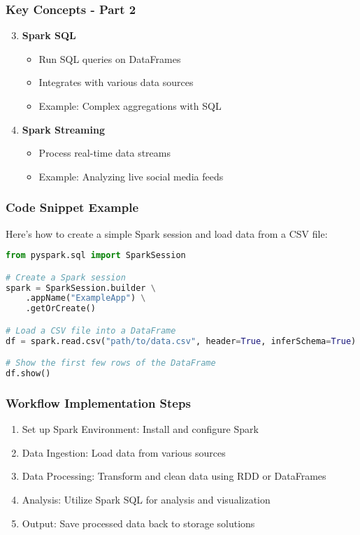 \documentclass[aspectratio=169]{beamer}
\begin{document}
\begin{frame}[fragile]
    \frametitle{Key Concepts - Part 2}
    \begin{enumerate}
        \setcounter{enumi}{2}
        \item \textbf{Spark SQL}
            \begin{itemize}
                \item Run SQL queries on DataFrames
                \item Integrates with various data sources
                \item Example: Complex aggregations with SQL
            \end{itemize}
        \item \textbf{Spark Streaming}
            \begin{itemize}
                \item Process real-time data streams
                \item Example: Analyzing live social media feeds
            \end{itemize}
    \end{enumerate}
\end{frame}

\begin{frame}[fragile]
    \frametitle{Code Snippet Example}
    Here's how to create a simple Spark session and load data from a CSV file:
    \begin{lstlisting}[language=Python]
from pyspark.sql import SparkSession

# Create a Spark session
spark = SparkSession.builder \
    .appName("ExampleApp") \
    .getOrCreate()

# Load a CSV file into a DataFrame
df = spark.read.csv("path/to/data.csv", header=True, inferSchema=True)

# Show the first few rows of the DataFrame
df.show()
    \end{lstlisting}
\end{frame}

\begin{frame}[fragile]
    \frametitle{Workflow Implementation Steps}
    \begin{enumerate}
        \item Set up Spark Environment: Install and configure Spark
        \item Data Ingestion: Load data from various sources
        \item Data Processing: Transform and clean data using RDD or DataFrames
        \item Analysis: Utilize Spark SQL for analysis and visualization
        \item Output: Save processed data back to storage solutions
    \end{enumerate}
\end{frame}
\end{document}
